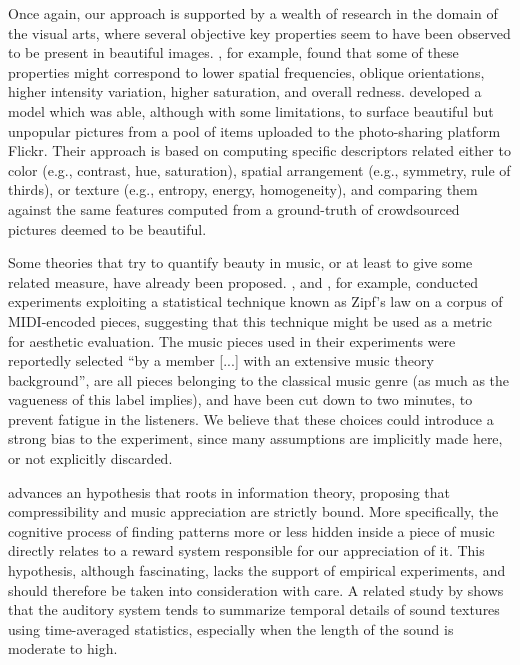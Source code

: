 Once again, our approach is supported by a wealth of research in the domain of the visual arts, where several objective key properties seem to have been observed to be present in beautiful images. \cite{jacobs2016aesthetics}, for example, found that some of these properties might correspond to lower spatial frequencies, oblique orientations, higher intensity variation, higher saturation, and overall redness. \cite{schifanella2015image} developed a model which was able, although with some limitations, to surface beautiful but unpopular pictures from a pool of items uploaded to the photo-sharing platform Flickr. Their approach is based on computing specific descriptors related either to color (e.g., contrast, hue, saturation), spatial arrangement (e.g., symmetry, rule of thirds), or texture (e.g., entropy, energy, homogeneity), and comparing them against the same features computed from a ground-truth of crowdsourced pictures deemed to be beautiful.

Some theories that try to quantify beauty in music, or at least to give some related measure, have already been proposed. \cite{manaris2002progress}, and \cite{manaris2005zipf}, for example, conducted experiments exploiting a statistical technique known as Zipf’s law on a corpus of MIDI-encoded pieces, suggesting that this technique might be used as a metric for aesthetic evaluation. The music pieces used in their experiments were reportedly selected ``by a member [...] with an extensive music theory background'', are all pieces belonging to the classical music genre (as much as the vagueness of this label implies), and have been cut down to two minutes, to prevent fatigue in the listeners. We believe that these choices could introduce a strong bias to the experiment, since many assumptions are implicitly made here, or not explicitly discarded.

\cite{hudson2011musical} advances an hypothesis that roots in information theory, proposing that compressibility and music appreciation are strictly bound. More specifically, the cognitive process of finding patterns more or less hidden inside a piece of music directly relates to a reward system responsible for our appreciation of it. This hypothesis, although fascinating, lacks the support of empirical experiments, and should therefore be taken into consideration with care. A related study by \cite{mcdermott2013summary} shows that the auditory system tends to summarize temporal details of sound textures using time-averaged statistics, especially when the length of the sound is moderate to high.


